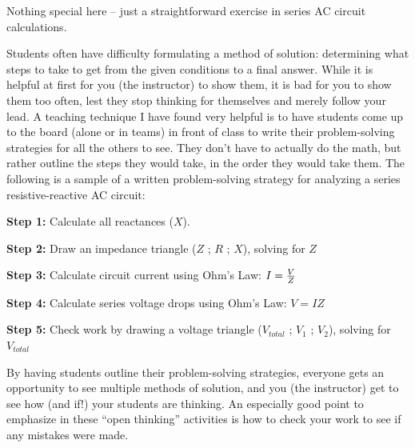 





Nothing special here -- just a straightforward exercise in series AC circuit calculations.  

\vskip 10pt

Students often have difficulty formulating a method of solution: determining what steps to take to get from the given conditions to a final answer.  While it is helpful at first for you (the instructor) to show them, it is bad for you to show them too often, lest they stop thinking for themselves and merely follow your lead.  A teaching technique I have found very helpful is to have students come up to the board (alone or in teams) in front of class to write their problem-solving strategies for all the others to see.  They don't have to actually do the math, but rather outline the steps they would take, in the order they would take them.  The following is a sample of a written problem-solving strategy for analyzing a series resistive-reactive AC circuit:

\vskip 10pt

\goodbreak

{\bf Step 1:} Calculate all reactances ($X$).

{\bf Step 2:} Draw an impedance triangle ($Z$ ; $R$ ; $X$), solving for $Z$

{\bf Step 3:} Calculate circuit current using Ohm's Law: $I = {V \over Z}$

{\bf Step 4:} Calculate series voltage drops using Ohm's Law: $V = {I Z}$

{\bf Step 5:} Check work by drawing a voltage triangle ($V_{total}$ ; $V_1$ ; $V_2$), solving for $V_{total}$

\vskip 10pt

By having students outline their problem-solving strategies, everyone gets an opportunity to see multiple methods of solution, and you (the instructor) get to see how (and if!) your students are thinking.  An especially good point to emphasize in these ``open thinking'' activities is how to check your work to see if any mistakes were made.




